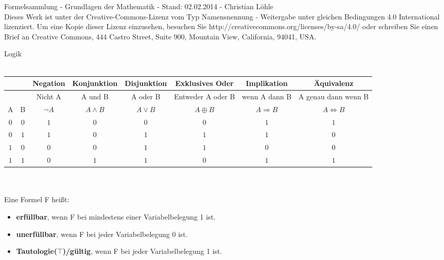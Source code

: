 \documentclass[11pt]{article}
\begin{document}
Formelsammlung - Grundlagen der Mathematik - Stand: 02.02.2014 - Christian L{\"o}hle\\
\footnotesize Dieses Werk ist unter der Creative-Commons-Lizenz vom Typ Namensnennung - Weitergabe unter gleichen Bedingungen 4.0 International lizenziert. Um eine Kopie dieser Lizenz einzusehen, besuchen Sie http://creativecommons.org/licenses/by-sa/4.0/ oder schreiben Sie einen Brief an Creative Commons, 444 Castro Street, Suite 900, Mountain View, California, 94041, USA.\\\normalsize

Logik \\ \\
\begin{tabular}{|c|c|c|c|c|c|c|c|} \hline
&& Negation & Konjunktion & Disjunktion & Exklusives Oder & Implikation & {\"A}quivalenz\\ \hline
&& Nicht A & A und B & A oder B & Entweder A oder B & wenn A dann B & A genau dann wenn B\\ \hline
A & B & $\neg A$  &  $A \land B$ & $A \lor B$ &  $A \oplus B$ & $A \Rightarrow B$ & $A \Leftrightarrow B$ \\ \hline
$0$ & $0$ & $1$ & $0$ & $0$ & $0$ & $1$ & $1$ \\ \hline
$0$ & $1$ & $1$ & $0$ & $1$ & $1$ & $1$ & $0$ \\ \hline
$1$ & $0$ & $0$ & $0$ & $1$ & $1$ & $0$ & $0$ \\ \hline
$1$ & $1$ & $0$ & $1$ & $1$ & $0$ & $1$ & $1$ \\ \hline
\end{tabular}\\ \\
Eine Formel F hei{\ss}t:
\begin{itemize}\itemsep0em\small
\item {\bfseries erf{\"u}llbar}, wenn F bei mindestens einer Variabelbelegung 1 ist.\\
\item {\bfseries unerf{\"u}llbar}, wenn F bei jeder Variabelbelegung 0 ist.\\
\item {\bfseries Tautologie($\top$)/g{\"u}ltig}, wenn F bei jeder Variabelbelegung 1 ist.
\end{itemize}\normalsize
\end{document}
